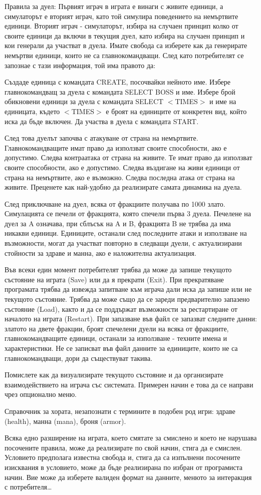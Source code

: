 Правила за дуел\+: Първият играч в играта е винаги с живите единици, а симулаторът е вторият играч, като той симулира поведението на немъртвите единици. Вторият играч -\/ симулаторът, избира на случаен принцип колко от своите единици да включи в текущия дуел, като избира на случаен принцип и кои генерали да участват в дуела. Имате свобода са изберете как да генерирате немъртви единици, които не са главнокомандващи. След като потребителят се запознае с тази информация, той има правото да\+:

Създаде единица с командата CREATE, посочвайки нейното име. Избере главнокомандващ за дуела с командата SELECT BOSS и име. Избере брой обикновени единици за дуела с командата SELECT  $<$\+TIMES$>$ и име на единицата, където $<$\+TIMES$>$ е броят на единиците от конкретен вид, който иска да бъде включен. Да участва в дуела с командата START.

След това дуелът започва с атакуване от страна на немъртвите. Главнокомандващите имат право да използват своите способности, ако е допустимо. Следва контраатака от страна на живите. Те имат право да използват своите способности, ако е допустимо. Следва въздигане на живи единици от страна на немъртвите, ако е възможно. Следва последна атака от страна на живите. Преценете как най-\/удобно да реализирате самата динамика на дуела.

След приключване на дуел, всяка от фракциите получава по 1000 злато. Симулацията се печели от фракцията, която спечели първа 3 дуела. Печелене на дуел за A означава, при сблъсък на A и B, фракцията B не трябва да има никакви единици. Единиците, останали след последните атаки и използване на възможности, могат да участват повторно в следващи дуели, с актуализирани стойности за здраве и манна, ако е наложителна актуализация.

Във всеки един момент потребителят трябва да може да запише текущото състояние на играта (Save) или да я прекрати (Exit). При прекратяване програмата трябва да извежда запитване към играча дали иска да запише или не текущото състояние. Трябва да може също да се зареди предварително запазено състояние (Load), както и да се поддържат възможности за рестартиране от началото на играта (Restart). При запазване във файл се запазват следните данни\+: златото на двете фракции, броят спечелени дуели на всяка от фракциите, главнокомандващите единици, останали за използване -\/ техните имена и характеристики. Не се записват във файл данните за единиците, които не са главнокомандващи, дори да съществуват такива.

Помислете как да визуализирате текущото състояние и да организирате взаимодействието на играча със системата. Примерен начин е това да се направи чрез опционално меню.

Справочник за хората, незапознати с термините в подобен род игри\+: здраве (health), манна (mana), броня (armor).

Всяка едно разширение на играта, което смятате за смислено и което не нарушава посочените правила, може да реализирате по свой начин, стига да е смислен. Условието предполага известна свобода и, стига да са изпълнени посочените изисквания в условието, може да бъде реализирана по избран от програмиста начин. Вие може да изберете валиден формат на данните, менюто за интеракция с потребителя… 